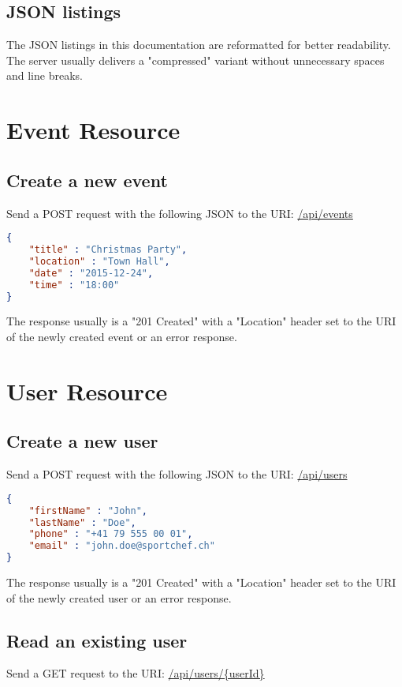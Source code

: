 \documentclass[a4paper,openright,twoside]{report}
\begin{document}
\subsection{JSON listings}
The JSON listings in this documentation are reformatted for better readability. The server usually delivers a "compressed" variant without unnecessary spaces and line breaks.

\section{Event Resource}

\subsection{Create a new event}
Send a POST request with the following JSON to the URI: \url{/api/events}

\begin{lstlisting}[language=json]
{
	"title" : "Christmas Party",
	"location" : "Town Hall",
	"date" : "2015-12-24",
	"time" : "18:00"
}
\end{lstlisting}

The response usually is a "201 Created" with a "Location" header set to the URI of the newly created event or an error response.

\section{User Resource}

\subsection{Create a new user}
Send a POST request with the following JSON to the URI: \url{/api/users}

\begin{lstlisting}[language=json]
{
	"firstName" : "John",
	"lastName" : "Doe",
	"phone" : "+41 79 555 00 01",
	"email" : "john.doe@sportchef.ch"
}
\end{lstlisting}

The response usually is a "201 Created" with a "Location" header set to the URI of the newly created user or an error response.

\subsection{Read an existing user}
Send a GET request to the URI: \url{/api/users/{userId}}
\end{document}
